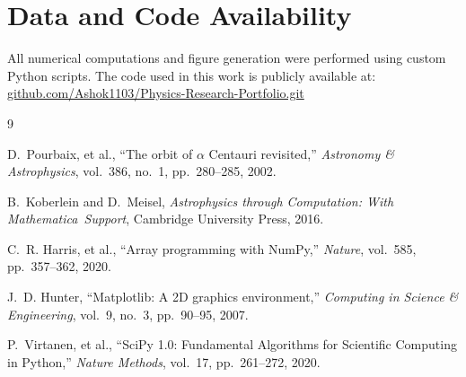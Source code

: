 \documentclass[11pt]{article}
\begin{document}
\section*{Data and Code Availability}
All numerical computations and figure generation were performed using custom Python scripts. The code used in this work is publicly available at:
\href{https://github.com/Ashok1103/Physics-Research-Portfolio.git}{github.com/Ashok1103/Physics-Research-Portfolio.git}

\begin{thebibliography}{9}

D.~Pourbaix, et al.,
\newblock ``The orbit of $\alpha$ Centauri revisited,''
\newblock \emph{Astronomy \& Astrophysics}, vol.~386, no.~1, pp.~280--285, 2002.

B.~Koberlein and D.~Meisel, 
\emph{Astrophysics through Computation: With Mathematica\textregistered\ Support}, 
Cambridge University Press, 2016.

C.~R. Harris, et al.,
\newblock ``Array programming with NumPy,''
\newblock \emph{Nature}, vol.~585, pp.~357--362, 2020.

J.~D. Hunter,
\newblock ``Matplotlib: A 2D graphics environment,''
\newblock \emph{Computing in Science \& Engineering}, vol.~9, no.~3, pp.~90--95, 2007.

P.~Virtanen, et al.,
\newblock ``SciPy 1.0: Fundamental Algorithms for Scientific Computing in Python,''
\newblock \emph{Nature Methods}, vol.~17, pp.~261--272, 2020.

\end{thebibliography}
\end{document}
